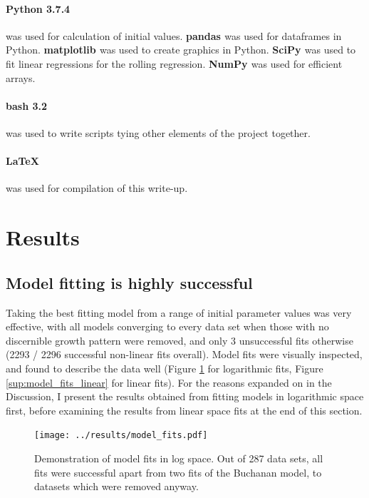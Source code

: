 \documentclass[11pt, a4paper]{article}
\begin{document}
\begin{linenumbers}
\paragraph{Python 3.7.4 \cite{python}} was used for calculation of initial values. \textbf{pandas \cite{pd}} was used for dataframes in Python. \textbf{matplotlib \cite{plt}} was used to create graphics in Python. \textbf{SciPy \cite{numpy}} was used to fit linear regressions for the rolling regression. \textbf{NumPy \cite{numpy}} was used for efficient arrays.

\paragraph{bash 3.2} was used to write scripts tying other elements of the project together.

\paragraph{\LaTeX } was used for compilation of this write-up.
\section{Results}

\subsection{Model fitting is highly successful}
Taking the best fitting model from a range of initial parameter values was very effective, with all models converging to every data set when those with no discernible growth pattern were removed, and only 3 unsuccessful fits otherwise (2293 / 2296 successful non-linear fits overall). Model fits were visually inspected, and found to describe the data well (Figure \ref{fig:model_fits} for logarithmic fits, Figure \ref{sup:model_fits_linear} for linear fits). For the reasons expanded on in the Discussion, I present the results obtained from fitting models in logarithmic space first, before examining the results from linear space fits at the end of this section.

         \begin{figure}[H]
         \centering
       	\texttt{[image: ../results/model\_fits.pdf]}
        \caption{Demonstration of model fits in log space. Out of 287 data sets, all fits were successful apart from two fits of the Buchanan model, to datasets which were removed anyway. }
        \label{fig:model_fits}
        \end{figure}


\end{linenumbers}
\end{document}
